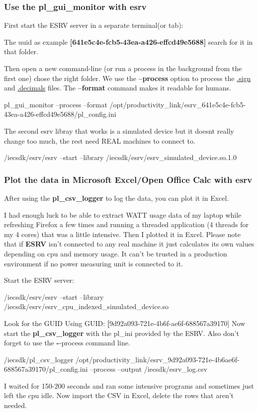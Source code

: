 \subsubsection{Use the pl\_gui\_monitor with esrv}
First start the ESRV server in a separate terminal(or tab):
The \gls{uuid} as example \textbf{[641e5c4e-fcb5-43ea-a426-effcd49e5688]}  search for it in that folder.

Then open a new command-line (or run a process in the background from the first one) chose the right folder. 
We use the \textbf{--process} option to process the \underline{.sign} and \underline{.decimals} files. The \textbf{--format} command makes it readable for humans.
\begin{codelisting}
	pl_gui_monitor --process --format /opt/productivity_link/esrv_641e5c4e-fcb5-43ea-a426-effcd49e5688/pl_config.ini 
\end{codelisting}
The second esrv libray that works is a simulated device but it doesnt really change too much, the rest need REAL machines to connect to.
\begin{codelisting}
	/iecsdk/esrv/esrv --start --library /iecsdk/esrv/esrv_simulated_device.so.1.0
\end{codelisting}

\subsubsection{Plot the data in Microsoft Excel/Open Office Calc with esrv}
After using the \textbf{pl\_csv\_logger} to log the data, you can plot it in Excel.

I had enough luck to be able to extract WATT usage data of my laptop while refreshing Firefox a few times and running a threaded application (4 threads for my 4 cores) that was a little intensive. Then I plotted it in Excel. Please note that if \textbf{ESRV} isn't connected to any real machine it just calculates its own values depending on \gls{cpu} and memory usage. It can't be trusted in a production environment if no power measuring unit is connected to it.

Start the ESRV server:
\begin{codelisting}
	/iecsdk/esrv/esrv --start --library /iecsdk/esrv/esrv_cpu_indexed_simulated_device.so
\end{codelisting}
Look for the GUID Using GUID:     \textbf[9d92a093-721e-4b6f-ae6f-688567a39170]
{}
Now  start the \textbf{pl\_csv\_logger} with the pl\_ini provided by the ESRV. Also don't forget to use the \textbf --process command line.
\begin{codelisting}
	/iecsdk/pl_csv_logger /opt/productivity_link/esrv_9d92a093-721e-4b6ae6f-688567a39170/pl_config.ini --process --output /iecsdk/esrv_log.csv
\end{codelisting}
I waited for 150-200 seconds and ran some intensive programs and sometimes just left the \gls{cpu} idle. Now import the CSV in Excel, delete the rows that aren't needed.

